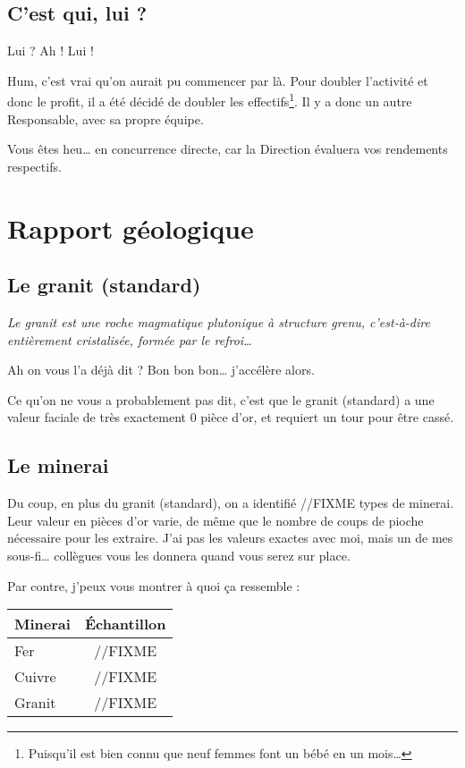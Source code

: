 \subsection{C'est qui, lui ?}
Lui ? Ah ! Lui !

Hum, c'est vrai qu'on aurait pu commencer par là. Pour doubler l'activité et donc le profit, il a été décidé de doubler les effectifs\footnote{Puisqu'il est bien connu que neuf femmes font un bébé en un mois\ldots{}}. Il y a donc un autre Responsable, avec sa propre équipe.

Vous êtes heu\ldots{} en concurrence directe, car la Direction évaluera vos rendements respectifs.

\newpage
\section{Rapport géologique}
\subsection{Le granit (standard)}
\textit{Le granit est une roche magmatique plutonique à structure grenu, c'est-à-dire entièrement cristalisée, formée par le refroi\ldots{}}

Ah on vous l'a déjà dit ? Bon bon bon\ldots{} j'accélère alors.

Ce qu'on ne vous a probablement pas dit, c'est que le granit (standard) a une valeur faciale de très exactement 0 pièce d'or, et requiert un tour pour être cassé.


\subsection{Le minerai}
Du coup, en plus du granit (standard), on a identifié //FIXME types de minerai. 
Leur valeur en pièces d'or varie, de même que le nombre de coups de pioche nécessaire pour les extraire.
J'ai pas les valeurs exactes avec moi, mais un de mes sous-fi\ldots{} collègues vous les donnera quand vous serez sur place.

Par contre, j'peux vous montrer à quoi ça ressemble :
\begin{center}
        \begin{tabular}{|l|c|}
                \hline
                Minerai & Échantillon \\
                \hline
                Fer & //FIXME \\
                Cuivre & //FIXME \\
                \hline
                Granit & //FIXME \\
                \hline
        \end{tabular}
\end{center}

